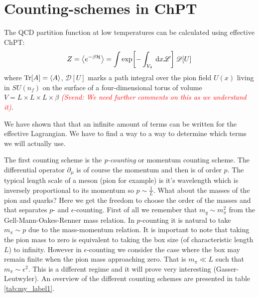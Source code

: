 \documentclass[a4,10pt,titlepage]{article}
\renewcommand\[{\begin{equation*}}
\renewcommand\]{\end{equation*}}
\numberwithin{equation}{section}
\newcommand{\PD}{\mathscr{D}}
\newcommand{\edit}[1]{\textcolor{red}{\textit{#1}}}
\newcommand{\ham}{\mathcal{H}}
\newcommand{\Lar}{\mathscr{L}}
\begin{document}
\section{Counting-schemes in ChPT}
The QCD partition function at low temperatures can be calculated using effective ChPT:
\[
Z=\expval{e^{-\beta \ham}}=\int \exp[-\int_{V_4}\:\dd x \Lar]\:\PD[U]
\]
where $\Tr[A]=\expval{A}$, $\PD[U]$ marks a path integral over the pion field $U(x)$ living in $SU(n_f)$ on the surface of a four-dimensional torus of volume $V=L\times L\times L\times \beta$ \edit{(Svend: We need further comments on this as we understand it)}.

We have shown that that an infinite amount of terms can be written for the effective Lagrangian. We have to find a way to a way to determine which terms we will actually use. 

The first counting scheme is the \textit{p-counting} or momentum counting scheme. The differential operator $\partial_\mu$ is of course the momentum and then is of order $p$. The typical length scale of a meson (pion for example) is it's wavelength which is inversely proportional to its momentum so $p\sim\frac{1}{L}$. What about the masses of the pion and quarks? Here we get the freedom to choose the order of the masses and that separates $p$- and $\epsilon$-counting. First of all we remember that $m_q\sim m_\pi^2$ from the Gell-Mann-Oakes-Renner mass relation.  In $p$-counting it is natural to take $m_\pi\sim p$ due to the mass-momentum relation. It is important to note that taking the pion mass to zero is equivalent to taking the box size (of characteristic length $L$) to infinity. However in $\epsilon$-counting we consider the case where the box may remain finite when the pion mass approaching zero. That is $m_\pi \ll L$ such that $m_\pi \sim \epsilon^2$. This is a different regime and it will prove very interesting (Gasser-Leutwyler). An overview of the different counting schemes are presented in table \ref{tab:my_label1}.
\end{document}
